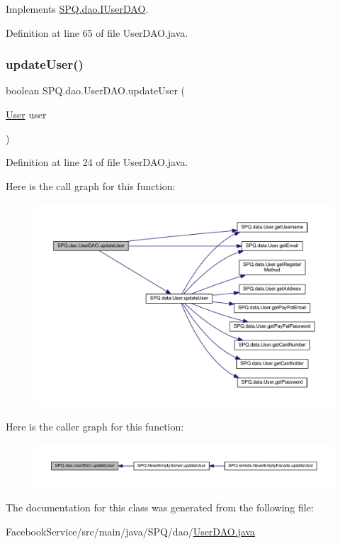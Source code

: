 Implements \mbox{\hyperlink{interface_s_p_q_1_1dao_1_1_i_user_d_a_o_a286f084c9e920d1ce196658ab63ab0af}{S\+P\+Q.\+dao.\+I\+User\+D\+AO}}.



Definition at line 65 of file User\+D\+A\+O.\+java.

\mbox{\label{class_s_p_q_1_1dao_1_1_user_d_a_o_a525b7db52aab94cfe24aeac14949504e}} 
\subsubsection{\texorpdfstring{update\+User()}{updateUser()}}
{\footnotesize\ttfamily boolean S\+P\+Q.\+dao.\+User\+D\+A\+O.\+update\+User (\begin{DoxyParamCaption}\item[{\mbox{\hyperlink{class_s_p_q_1_1data_1_1_user}{User}}}]{user }\end{DoxyParamCaption})}



Definition at line 24 of file User\+D\+A\+O.\+java.

Here is the call graph for this function\+:\nopagebreak
\begin{figure}[H]
\begin{center}
\leavevmode
\includegraphics[width=350pt]{class_s_p_q_1_1dao_1_1_user_d_a_o_a525b7db52aab94cfe24aeac14949504e_cgraph}
\end{center}
\end{figure}
Here is the caller graph for this function\+:\nopagebreak
\begin{figure}[H]
\begin{center}
\leavevmode
\includegraphics[width=350pt]{class_s_p_q_1_1dao_1_1_user_d_a_o_a525b7db52aab94cfe24aeac14949504e_icgraph}
\end{center}
\end{figure}


The documentation for this class was generated from the following file\+:\begin{DoxyCompactItemize}
\item 
Facebook\+Service/src/main/java/\+S\+P\+Q/dao/\mbox{\hyperlink{_facebook_service_2src_2main_2java_2_s_p_q_2dao_2_user_d_a_o_8java}{User\+D\+A\+O.\+java}}\end{DoxyCompactItemize}
